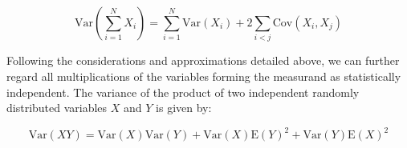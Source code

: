\begin{equation}
\label{eq:unc_sum}
\mathrm{Var}\left(\sum_{i=1}^N X_i\right) = \sum_{i=1}^N\mathrm{Var}(X_i) + 2\sum_{i < j}\mathrm{Cov}(X_i, X_j)
\end{equation}

Following the considerations and approximations detailed above, we can further regard all multiplications of the variables forming the measurand as statistically independent. 
The variance of the product of two independent randomly distributed variables $X$ and $Y$ is given by:

\begin{equation}
\label{eq:unc_prod}
\mathrm{Var}(XY) = \mathrm{Var}(X)\mathrm{Var}(Y) + \mathrm{Var}(X) \mathrm{E}(Y)^2 + \mathrm{Var}(Y) \mathrm{E}(X)^2
\end{equation}

